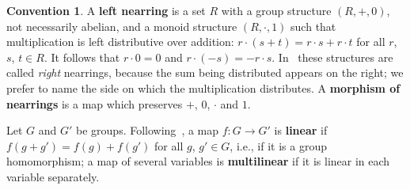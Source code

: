 \documentclass[reqno,a4paper]{amsart}
\theoremstyle{plain}
\theoremstyle{definition}
\newtheorem{convention}[subsection]{Convention}
\newcommand{\defn}{\textbf}
\begin{document}
\begin{convention}\label{conv:nearring}
  A \defn{left nearring} is a set \(R\) with a group structure \((R,+,0)\), not necessarily abelian, and a monoid structure \((R,\cdot,1)\) such that multiplication is left distributive over addition: \(r\cdot(s+t)=r\cdot s+r\cdot t\) for all \(r\), \(s\), \(t\in R\). It follows that \(r\cdot 0=0\) and \(r\cdot(-s)=-r\cdot s\). In~\cite{BHP} these structures are called \emph{right} nearrings, because the sum being distributed appears on the right; we prefer to name the side on which the multiplication distributes. A \defn{morphism of nearrings} is a map which preserves \(+\), \(0\), \(\cdot\) and \(1\).
\end{convention}

Let \(G\) and \(G'\) be groups. Following~\cite{BHP}, a map \(f\colon G\to G'\) is \defn{linear} if \(f(g+g')=f(g)+f(g')\) for all \(g\), \(g'\in G\), i.e., if it is a group homomorphism; a map of several variables is \defn{multilinear} if it is linear in each variable separately.
\end{document}
